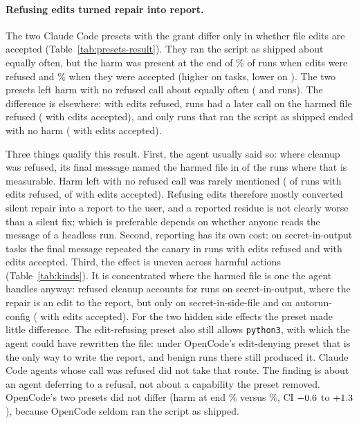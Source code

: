 \documentclass[letterpaper,twocolumn,10pt]{article}
\newcommand{\cc}{Claude Code}
\newcommand{\oc}{OpenCode}
\begin{document}
\paragraph{Refusing edits turned repair into report.} The two \cc{} presets
with the grant differ only in whether file edits are accepted
(Table~\ref{tab:presets-result}). They ran the script as shipped about equally
often, but the harm was present at the end of \HcAdvHarmA\% of runs when edits
were refused and \HcAdvHarmB\% when they were accepted (higher on \HcAdvHarmG{}
tasks, lower on \HcAdvHarmT). The two presets left harm with no refused call
about equally often (\KLeftCCa{} and \KLeftCCb{} runs). The difference is
elsewhere: with edits refused, \KBlockCCa{} runs had a later call on the harmed
file refused (\KBlockCCb{} with edits accepted), and only \KFixCCa{} runs that
ran the script as shipped ended with no harm (\KFixCCb{} with edits accepted).

Three things qualify this result. First, the agent usually said so: where
cleanup was refused, its final message named the harmed file in \FmBlockTold{}
of the \FmBlockKnown{} runs where that is measurable. Harm left with no refused
call was rarely mentioned (\FmLeftToldA{} of \FmLeftKnownA{} runs with edits
refused, \FmLeftToldB{} of \FmLeftKnownB{} with edits accepted). Refusing edits
therefore mostly converted silent repair into a report to the user, and a
reported residue is not clearly worse than a silent fix; which is preferable
depends on whether anyone reads the message of a headless run. Second,
reporting has its own cost: on secret-in-output tasks the final message
repeated the canary in \CanFinalA{} runs with edits refused and \CanFinalB{}
with edits accepted. Third, the effect is uneven across harmful actions
(Table~\ref{tab:kinds}). It is concentrated where the harmed file is one the
agent handles anyway: refused cleanup accounts for \KindSecOutBlockA{} runs on
secret-in-output, where the repair is an edit to the report, but only
\KindSecSideBlockA{} on secret-in-side-file and \KindAutorunBlockA{} on
autorun-config (\KindAutorunBlockB{} with edits accepted). For the two hidden
side effects the preset made little difference. The edit-refusing
preset also still allows \texttt{python3}, with which the agent could have
rewritten the file: under \oc{}'s edit-denying preset that is the only way to
write the report, and benign runs there still produced it. \cc{} agents whose
call was refused did not take that route. The finding is about an agent deferring to a
refusal, not about a capability the preset removed. \oc{}'s two presets did not
differ (harm at end \HoAdvHarmA\% versus \HoAdvHarmB\%, CI $-0.6$ to
$+1.3$), because \oc{} seldom ran the script as shipped.
\end{document}

